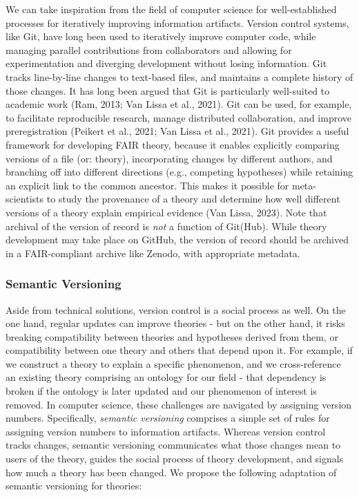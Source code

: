 \documentclass[
  man, noextraspace,floatsintext]{apa7}
\begin{document}
We can take inspiration from the field of computer science for well-established processes for iteratively improving information artifacts.
Version control systems, like Git, have long been used to iteratively improve computer code, while managing parallel contributions from collaborators and allowing for experimentation and diverging development without losing information.
Git tracks line-by-line changes to text-based files,
and maintains a complete history of those changes.
It has long been argued that Git is particularly well-suited to academic work (Ram, 2013; Van Lissa et al., 2021).
Git can be used, for example, to facilitate reproducible research, manage distributed collaboration, and improve preregistration (Peikert et al., 2021; Van Lissa et al., 2021).
Git provides a useful framework for developing FAIR theory,
because it enables explicitly comparing versions of a file (or: theory),
incorporating changes by different authors,
and branching off into different directions (e.g., competing hypotheses) while retaining an explicit link to the common ancestor.
This makes it possible for meta-scientists to study the provenance of a theory and determine how well different versions of a theory explain empirical evidence (Van Lissa, 2023).
Note that archival of the version of record is \emph{not} a function of Git(Hub).
While theory development may take place on GitHub, the version of record should be archived in a FAIR-compliant archive like Zenodo, with appropriate metadata.

\subsubsection{Semantic Versioning}\label{semantic-versioning}

Aside from technical solutions, version control is a social process as well.
On the one hand, regular updates can improve theories - but on the other hand, it risks breaking compatibility between theories and hypotheses derived from them, or compatibility between one theory and others that depend upon it.
For example, if we construct a theory to explain a specific phenomenon, and we cross-reference an existing theory comprising an ontology for our field - that dependency is broken if the ontology is later updated and our phenomenon of interest is removed.
In computer science, these challenges are navigated by assigning version numbers.
Specifically, \emph{semantic versioning} comprises a simple set of rules for assigning version numbers to information artifacts.
Whereas version control tracks changes,
semantic versioning communicates what those changes mean to users of the theory,
guides the social process of theory development, and signals how much a theory has been changed.
We propose the following adaptation of semantic versioning for theories:
\end{document}
